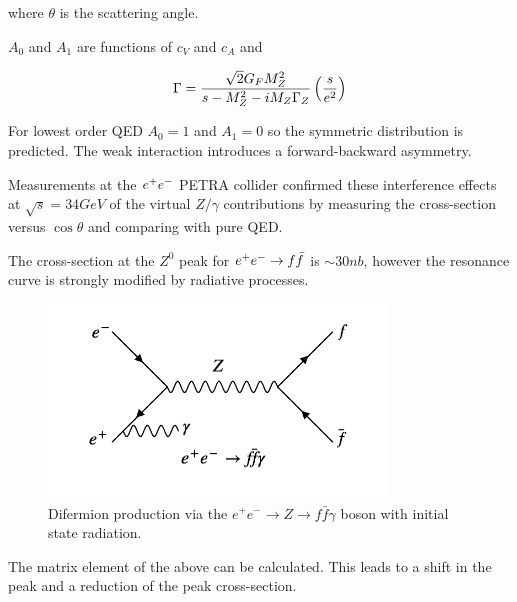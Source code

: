 where $\theta$ is the scattering angle.

$A_0$ and $A_1$ are functions of $c_V$ and $c_A$ and

\[
  \Gamma = \frac{\sqrt{2}G_FM_Z^2}{s - M_Z^2 - iM_Z\Gamma_Z}\left(\frac{s}{e^2}\right)
\]

For lowest order QED $A_0 = 1$ and $A_1 = 0$ so the symmetric distribution is predicted.  The weak interaction introduces a forward-backward asymmetry.

Measurements at the $e^+e^-$ PETRA collider confirmed these interference effects at $\sqrt{s} = 34GeV$ of the virtual $Z/\gamma$ contributions by measuring the cross-section versus $\cos\theta$ and comparing with pure QED.

The cross-section at the $Z^0$ peak for $e^+e^- \to f\bar{f}$ is $\sim 30 nb$, however the resonance curve is strongly modified by radiative processes.

\begin{figure}[!htb]
  \begin{center}
    \includegraphics[width=0.8\textwidth]{images/web_feynman/image_59.png}
    \caption[Difermion production via the $Z$ boson with initial state radiation]{Difermion production via the $e^+e^-\to Z\to f\bar{f}\gamma$ boson with initial state radiation.}
    \label{fig:ch13_ZToFFGamma}
  \end{center}
\end{figure}


The matrix element of the above can be calculated.  This leads to a shift in the peak and a reduction of the peak cross-section.
